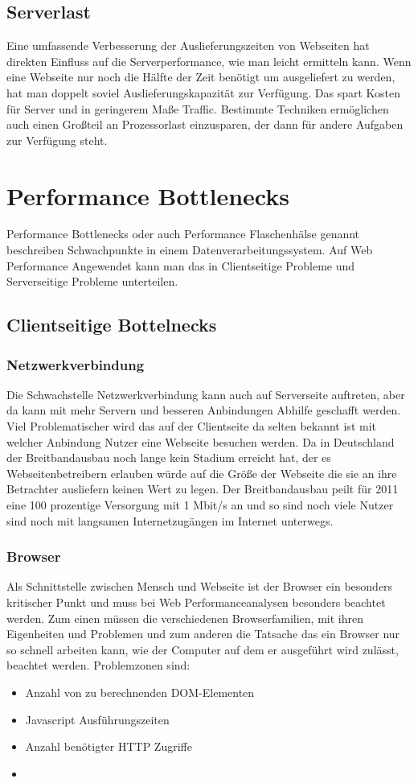 \subsection{Serverlast}
Eine umfassende Verbesserung der Auslieferungszeiten von Webseiten hat direkten Einfluss auf die Serverperformance, wie man leicht ermitteln kann. Wenn eine Webseite nur noch die Hälfte der Zeit benötigt um ausgeliefert zu werden, hat man doppelt soviel Auslieferungskapazität zur Verfügung. Das spart Kosten für Server und in geringerem Maße Traffic. Bestimmte Techniken ermöglichen auch einen Großteil an Prozessorlast einzusparen, der dann für andere Aufgaben zur Verfügung steht.

\section{Performance Bottlenecks}
Performance Bottlenecks oder auch Performance Flaschenhälse genannt beschreiben Schwachpunkte in einem Datenverarbeitungssystem. Auf Web Performance Angewendet kann man das in Clientseitige Probleme und Serverseitige Probleme unterteilen.
\subsection{Clientseitige Bottelnecks}
\subsubsection{Netzwerkverbindung}Die Schwachstelle Netzwerkverbindung kann auch auf Serverseite auftreten, aber da kann mit mehr Servern und besseren Anbindungen Abhilfe geschafft werden. Viel Problematischer wird das auf der Clientseite da selten bekannt ist mit welcher Anbindung Nutzer eine Webseite besuchen werden.%
Da in Deutschland der Breitbandausbau noch lange kein Stadium erreicht hat, der es Webseitenbetreibern erlauben würde auf die Größe der Webseite die sie an ihre Betrachter ausliefern keinen Wert zu legen. Der Breitbandausbau peilt für 2011 eine 100 prozentige Versorgung mit 1 Mbit/s an und so sind noch viele Nutzer sind noch mit langsamen Internetzugängen im Internet unterwegs. 

\subsubsection{Browser}
Als Schnittstelle zwischen Mensch und Webseite ist der Browser ein besonders kritischer Punkt und muss bei Web Performanceanalysen besonders beachtet werden. Zum einen müssen die verschiedenen Browserfamilien, mit ihren Eigenheiten und Problemen und zum anderen die Tatsache das ein Browser nur so schnell arbeiten kann, wie der Computer auf dem er ausgeführt wird zulässt, beachtet werden. Problemzonen sind:
\begin{itemize}
  \item Anzahl von zu berechnenden DOM-Elementen
  \item Javascript Ausführungszeiten
  \item Anzahl benötigter HTTP Zugriffe
  \item 

\end{itemize}

